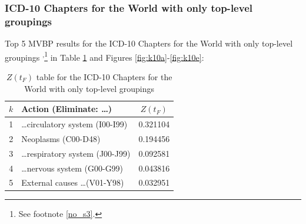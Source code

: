 \documentclass[10pt, a4paper, twocolumn]{IEEEconf}
\newcommand\footnotesstartsep{\textsuperscript{,}}
\begin{document}
% 
% 
% 

\subsubsection{ICD-10 Chapters for the World with only top-level groupings}

Top 5 MVBP results for the ICD-10 Chapters for the World with only top-level groupings \citep{whomortality}\footnotesstartsep\footnote{See footnote \ref{no_s3}.} in Table \ref{table:ztable10} and Figures \ref{fig:k10a}-\ref{fig:k10e}:

\begin{table}[H]
  \centering
  \begin{tabular}{clc}
    \toprule
      $k$ & Action (Eliminate: \ldots) & $Z(t_F)$ \\
    \midrule
      1 &         \ldots circulatory system (I00-I99) & 0.321104 \\
      2 &                         Neoplasms (C00-D48) & 0.194456 \\
      3 &         \ldots respiratory system (J00-J99) & 0.092581 \\
      4 &             \ldots nervous system (G00-G99) & 0.043816 \\
      5 &            External causes \ldots (V01-Y98) & 0.032951 \\
    \bottomrule
  \end{tabular}
  \caption{$Z(t_F)$ table for the ICD-10 Chapters for the World with only top-level groupings}
  \label{table:ztable10}
\end{table}
\end{document}
